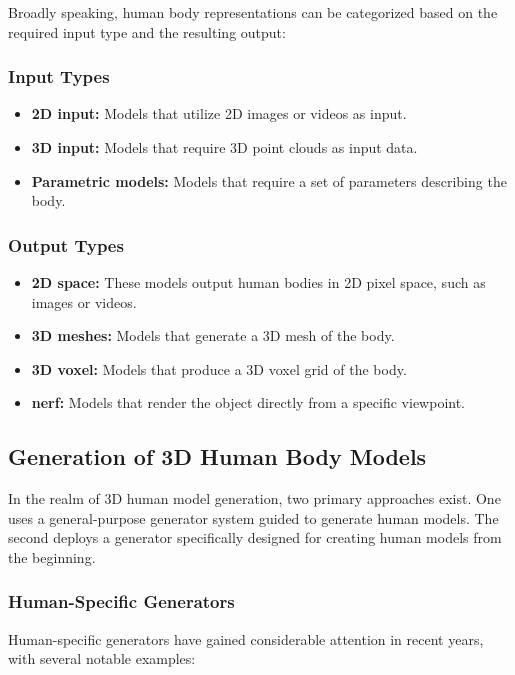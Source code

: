 Broadly speaking, human body representations can be categorized based on the
required input type and the resulting output:

\subsubsection{Input Types}

\begin{itemize}
	\item \textbf{2D input:} Models that utilize 2D images or videos as input.
	\item \textbf{3D input:} Models that require 3D point clouds as input data.
	\item \textbf{Parametric models:} Models that require a set of parameters describing the body.
\end{itemize}

\subsubsection{Output Types}

\begin{itemize}
	\item \textbf{2D space:} These models output human bodies in 2D pixel space, such as images or videos.
	\item \textbf{3D meshes:} Models that generate a 3D mesh of the body.
	\item \textbf{3D voxel:} Models that produce a 3D voxel grid of the body.
	\item \textbf{\gls{nerf}:} Models that render the object directly from a specific viewpoint.
\end{itemize}

\subsection{Generation of 3D Human Body Models}

In the realm of 3D human model generation, two primary approaches exist. One
uses a general-purpose generator system guided to generate human models. The
second deploys a generator specifically designed for creating human models from
the beginning.

\subsubsection{Human-Specific Generators}

Human-specific generators have gained considerable attention in recent years,
with several notable examples:

